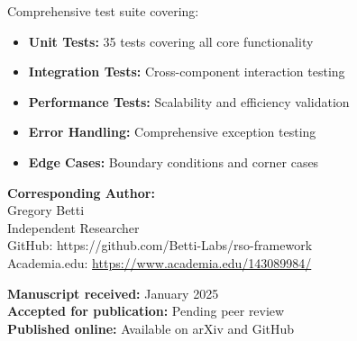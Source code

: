 \documentclass[11pt,a4paper]{article}
\begin{document}
Comprehensive test suite covering:

\begin{itemize}
    \item \textbf{Unit Tests:} 35 tests covering all core functionality
    \item \textbf{Integration Tests:} Cross-component interaction testing
    \item \textbf{Performance Tests:} Scalability and efficiency validation
    \item \textbf{Error Handling:} Comprehensive exception testing
    \item \textbf{Edge Cases:} Boundary conditions and corner cases
\end{itemize}

\vspace{1cm}

\noindent\textbf{Corresponding Author:}\\
Gregory Betti\\
Independent Researcher\\
GitHub: https://github.com/Betti-Labs/rso-framework\\
Academia.edu: \url{https://www.academia.edu/143089984/}

\vspace{0.5cm}

\noindent\textbf{Manuscript received:} January 2025\\
\textbf{Accepted for publication:} Pending peer review\\
\textbf{Published online:} Available on arXiv and GitHub
\end{document}
